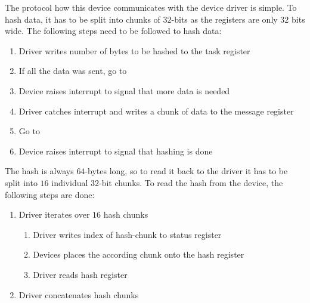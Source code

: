 The protocol how this device communicates with the device driver is simple.
To hash data, it has to be split into chunks of $32$-bits as the registers are
only $32$ bits wide.
The following steps need to be followed to hash data:
\begin{enumerate}
	\item Driver writes number of bytes to be hashed to the task register
	\item If all the data was sent, go to \label{item:check}
	\item Device raises interrupt to signal that more data is needed
	\item Driver catches interrupt and writes a chunk of data to the message
		register
	\item Go to 
	\item Device raises interrupt to signal that hashing is done\label{item:end}
\end{enumerate}
The hash is always $64$-bytes long, so to read it back to the driver it has to
be split into $16$ individual $32$-bit chunks.
To read the hash from the device, the following steps are done:
\begin{enumerate}
	\item Driver iterates over $16$ hash chunks
		\begin{enumerate}
			\item Driver writes index of hash-chunk to status register
			\item Devices places the according chunk onto the hash register
			\item Driver reads hash register
		\end{enumerate}
	\item Driver concatenates hash chunks
\end{enumerate}
